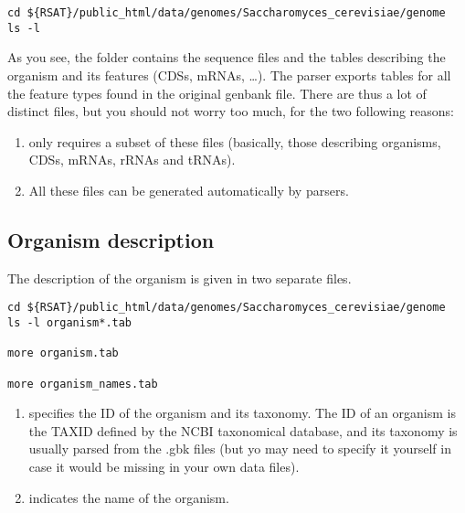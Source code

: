 \begin{footnotesize}
\begin{verbatim}
cd ${RSAT}/public_html/data/genomes/Saccharomyces_cerevisiae/genome
ls -l
\end{verbatim}
\end{footnotesize}

As you see, the folder  contains the sequence files and
the tables describing the organism and its features (CDSs, mRNAs,
\ldots). The \RSAT parser exports tables for all the feature types
found in the original genbank file. There are thus a lot of distinct
files, but you should not worry too much, for the two following
reasons:
\begin{enumerate}
\item \RSAT only requires a subset of these files (basically, those
  describing organisms, CDSs, mRNAs, rRNAs and tRNAs).
\item All these files can be generated automatically by \RSAT parsers.
\end{enumerate}

\subsection{Organism description} 

The description of the organism is given in two separate files.


\begin{footnotesize}
\begin{verbatim}
cd ${RSAT}/public_html/data/genomes/Saccharomyces_cerevisiae/genome
ls -l organism*.tab

more organism.tab

more organism_names.tab
\end{verbatim}
\end{footnotesize}

\begin{enumerate}
\item {} specifies the ID of the organism and its
  taxonomy. The ID of an organism is the TAXID defined by the NCBI
  taxonomical database, and its taxonomy is usually parsed from the
  .gbk files (but yo may need to specify it yourself in case it would
  be missing in your own data files).

\item {} indicates the name of the organism.
\end{enumerate}


